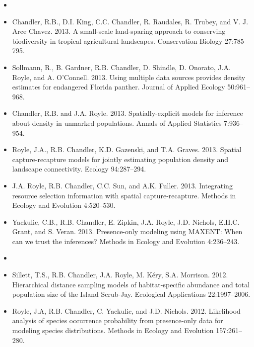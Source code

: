 \documentclass[12pt]{article}
\begin{document}
\begin{itemize}

\item[] { \\}

\item Chandler, R.B., D.I. King, C.C. Chandler, R. Raudales,
  R. Trubey, and V. J. Arce Chavez. 2013. A small-scale
  land-sparing approach to conserving biodiversity in tropical
  agricultural landscapes. Conservation Biology 27:785--795. 

\item Sollmann, R., B. Gardner, R.B. Chandler, D. Shindle,
  D. Onorato, J.A. Royle, and A. O'Connell. 2013.
  Using multiple data sources provides density estimates for
  endangered Florida panther. Journal of Applied Ecology 50:961--968.

\item Chandler, R.B. and J.A. Royle. 2013.
  Spatially-explicit models for inference about density in unmarked
  populations. Annals of Applied Statistics 7:936--954.

\item Royle, J.A., R.B. Chandler, K.D. Gazenski, and
  T.A. Graves. 2013. Spatial capture-recapture models for jointly
  estimating population density and landscape connectivity. Ecology
  94:287--294. 

\item J.A. Royle, R.B. Chandler, C.C. Sun, and
  A.K. Fuller. 2013. Integrating resource selection information with
  spatial capture-recapture. Methods in Ecology and Evolution 4:520--530.

\item Yackulic, C.B., R.B. Chandler, E. Zipkin, J.A. Royle,
  J.D. Nichols, E.H.C. Grant, and S. Veran. 2013. Presence-only
  modeling using MAXENT: When can we trust the inferences? Methods in
  Ecology and Evolution 4:236--243. 

\item[] { \\}

\item Sillett, T.S., R.B. Chandler, J.A. Royle, M. K\'{e}ry,
  S.A. Morrison. 2012. Hierarchical distance sampling models of
  habitat-specific abundance and total population size of the Island
  Scrub-Jay. Ecological Applications 22:1997--2006.

\item Royle, J.A, R.B. Chandler, C. Yackulic, and
  J.D. Nichols. 2012. Likelihood analysis of species occurrence
  probability from presence-only data for modeling species
  distributions. Methods in Ecology and Evolution 157:261--280.


\end{itemize}
\end{document}
